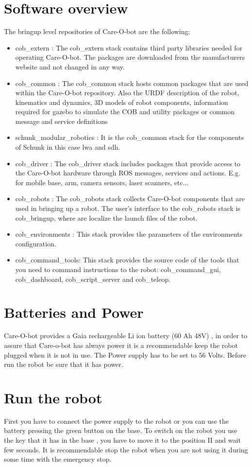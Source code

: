 \section{Software overview} 
The bringup level repositories of Care-O-bot are the following:
\begin{itemize}
\item {cob\_extern} : The cob\_extern stack contains third party libraries needed for operating Care-O-bot. The packages are downloaded from the manufacturers website and not changed in any way.
\item {cob\_common} : The cob\_common stack hosts common packages that are used within the Care-O-bot repository. Also the URDF description of the robot, kinematics and dynamics, 3D models of robot components, information required for gazebo to simulate the COB and utility packages or common message and service definitions
\item schunk\_modular\_robotics : It is the cob\_common stack for the components of Schunk in this case lwa and sdh. 
\item cob\_driver : The cob\_driver stack includes packages that provide access to the Care-O-bot hardware through ROS messages, services and actions. E.g. for mobile base, arm, camera sensors, laser scanners, etc...
\item cob\_robots :  The cob\_robots stack collects Care-O-bot components that are used in bringing up a robot. The user's interface to the cob\_robots stack is cob\_bringup,  where are localize the launch files of the robot.
\item cob\_environments : This stack provides the parameters of the environments configuration. 
\item cob\_command\_tools: This stack provides the source code of the tools that you need to command instructions to the robot: cob\_command\_gui, cob\_dashboard, cob\_script\_server and cob\_teleop. 
\end{itemize}
\section{Batteries and Power}
Care-O-bot provides a Gaia rechargeable Li ion battery (60 Ah 48V) , in order to assure that Care-o-bot has always power it is a recommendable keep the robot plugged when it is not in use. The Power supply has to be set to 56 Volts. Before run the robot be sure that it has power.
\section{Run the robot}
First you have to connect the power supply to the robot or you can use the battery pressing the green button on the base. To switch on the robot you use the key that it has in the base , you have to move it to the position II and wait few seconds. It is recommendable stop the robot when you are not using it during some time with the emergency stop.

